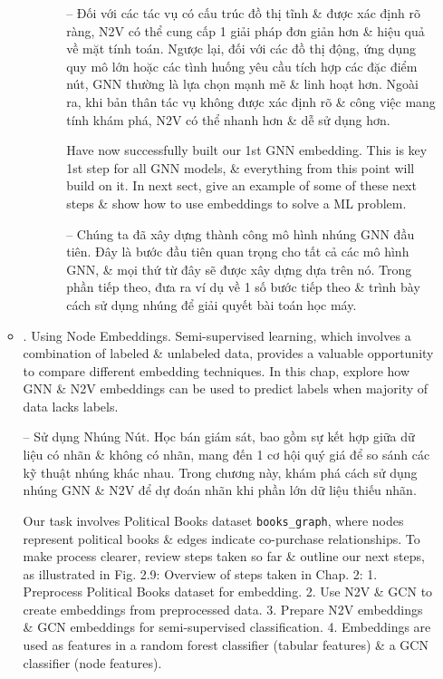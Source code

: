 \documentclass{article}
\begin{document}
\begin{itemize}
\begin{itemize}
\begin{itemize}
\begin{itemize}
               -- Đối với các tác vụ có cấu trúc đồ thị tĩnh \& được xác định rõ ràng, N2V có thể cung cấp 1 giải pháp đơn giản hơn \& hiệu quả về mặt tính toán. Ngược lại, đối với các đồ thị động, ứng dụng quy mô lớn hoặc các tình huống yêu cầu tích hợp các đặc điểm nút, GNN thường là lựa chọn mạnh mẽ \& linh hoạt hơn. Ngoài ra, khi bản thân tác vụ không được xác định rõ \& công việc mang tính khám phá, N2V có thể nhanh hơn \& dễ sử dụng hơn.

               Have now successfully built our 1st GNN embedding. This is key 1st step for all GNN models, \& everything from this point will build on it. In next sect, give an example of some of these next steps \& show how to use embeddings to solve a ML problem.

               -- Chúng ta đã xây dựng thành công mô hình nhúng GNN đầu tiên. Đây là bước đầu tiên quan trọng cho tất cả các mô hình GNN, \& mọi thứ từ đây sẽ được xây dựng dựa trên nó. Trong phần tiếp theo, đưa ra ví dụ về 1 số bước tiếp theo \& trình bày cách sử dụng nhúng để giải quyết bài toán học máy.
           \end{itemize}
       \end{itemize}
       \item {. Using Node Embeddings.} Semi-supervised learning, which involves a combination of labeled \& unlabeled data, provides a valuable opportunity to compare different embedding techniques. In this chap, explore how GNN \& N2V embeddings can be used to predict labels when majority of data lacks labels.

       -- {\sf Sử dụng Nhúng Nút.} Học bán giám sát, bao gồm sự kết hợp giữa dữ liệu có nhãn \& không có nhãn, mang đến 1 cơ hội quý giá để so sánh các kỹ thuật nhúng khác nhau. Trong chương này, khám phá cách sử dụng nhúng GNN \& N2V để dự đoán nhãn khi phần lớn dữ liệu thiếu nhãn.

       Our task involves Political Books dataset \verb|books_graph|, where nodes represent political books \& edges indicate co-purchase relationships. To make process clearer, review steps taken so far \& outline our next steps, as illustrated in {\sf Fig. 2.9: Overview of steps taken in Chap. 2: 1. Preprocess Political Books dataset for embedding. 2. Use N2V \& GCN to create embeddings from preprocessed data. 3. Prepare N2V embeddings \& GCN embeddings for semi-supervised classification. 4. Embeddings are used as features in a random forest classifier (tabular features) \& a GCN classifier (node features).}


\end{itemize}
\end{itemize}
\end{document}
